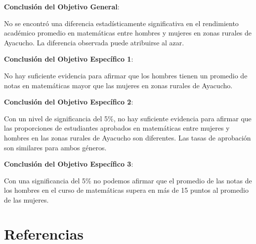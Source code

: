 \documentclass[
]{article}
\begin{document}
\textbf{Conclusión del Objetivo General}:

No se encontró una diferencia estadísticamente significativa en el
rendimiento académico promedio en matemáticas entre hombres y mujeres en
zonas rurales de Ayacucho. La diferencia observada puede atribuirse al
azar.

\textbf{Conclusión del Objetivo Específico 1}:

No hay suficiente evidencia para afirmar que los hombres tienen un
promedio de notas en matemáticas mayor que las mujeres en zonas rurales
de Ayacucho.

\textbf{Conclusión del Objetivo Específico 2}:

Con un nivel de significancia del 5\%, no hay suficiente evidencia para
afirmar que las proporciones de estudiantes aprobados en matemáticas
entre mujeres y hombres en las zonas rurales de Ayacucho son diferentes.
Las tasas de aprobación son similares para ambos géneros.

\textbf{Conclusión del Objetivo Específico 3}:

Con una significancia del 5\% no podemos afirmar que el promedio de las
notas de los hombres en el curso de matemáticas supera en más de 15
puntos al promedio de las mujeres.

\newpage

\section*{Referencias}\label{referencias}
\end{document}
